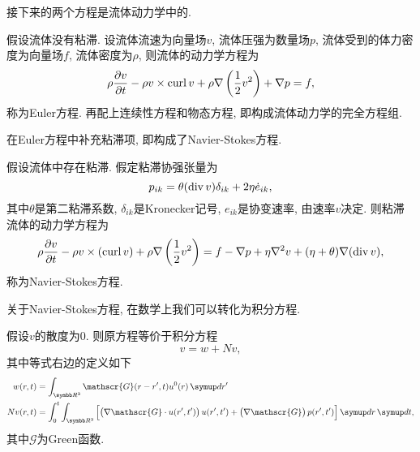 接下来的两个方程是流体动力学中的.

\begin{example}
    假设流体没有粘滞. 设流体流速为向量场$v$, 流体压强为数量场$p$, 流体受到的体力密度为向量场$f$, 流体密度为$\rho$, 则流体的动力学方程为
    \begin{equation}
        \rho\pdiff{v}{t}-\rho v\times \curl v + \rho\nabla\lr(){\frac{1}{2}v^2}+\nabla p = f,
    \end{equation}
    称为Euler方程. 再配上连续性方程和物态方程, 即构成流体动力学的完全方程组.
\end{example}

在Euler方程中补充粘滞项, 即构成了Navier-Stokes方程.

\begin{example}
    假设流体中存在粘滞. 假定粘滞协强张量为
    \begin{equation}
        p_{ik} = \theta(\divv v)\delta_{ik}+2\eta\dot{e}_{ik},
    \end{equation}
    其中$\theta$是第二粘滞系数, $\delta_{ik}$是Kronecker记号, $e_{ik}$是协变速率, 由速率$v$决定. 则粘滞流体的动力学方程为
    \begin{equation}
        \rho\pdiff{v}{t}-\rho v\times (\curl v) + \rho\nabla\lr(){\frac{1}{2}v^2} = f-\nabla p+\eta \nabla^2v+(\eta+\theta)\nabla (\divv v),
    \end{equation}
    称为Navier-Stokes方程.
\end{example}

关于Navier-Stokes方程, 在数学上我们可以转化为积分方程.

\begin{theorem}
    假设$v$的散度为0. 则原方程等价于积分方程
    \begin{equation}
        v = w + Nv,
    \end{equation}
    其中等式右边的定义如下
    \begin{align}
        w(r, t) &= \int_{\BR^3}\mathscr{G}(r-r', t)u^0(r)\diff r'\\
        Nv(r, t) &= \int_0^t\int_{\BR^3}\lr[]{\lr(){\nabla\mathscr{G}\cdot u(r', t')}u(r', t')+\lr(){\nabla\mathscr{G}}p(r', t')}\diff r\diff t,
    \end{align}
    其中$\mathscr{G}$为Green函数.
\end{theorem}
